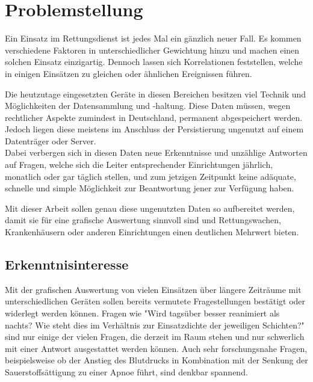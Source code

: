 \documentclass[12pt]{article}
\begin{document}
\maketitle \clearpage

\tableofcontents \clearpage

\section{Problemstellung}\label{problem}
Ein Einsatz im Rettungsdienst ist jedes Mal ein gänzlich neuer Fall. Es kommen
verschiedene Faktoren in unterschiedlicher Gewichtung hinzu und machen einen
solchen Einsatz einzigartig. Dennoch lassen sich Korrelationen feststellen,
welche in einigen Einsätzen zu gleichen oder ähnlichen Ereignissen führen.

Die heutzutage eingesetzten Geräte in diesen Bereichen besitzen viel Technik und
Möglichkeiten der Datensammlung und -haltung. Diese Daten müssen, wegen
rechtlicher Aspekte zumindest in Deutschland, permanent abgespeichert werden.
Jedoch liegen diese meistens im Anschluss der Persistierung ungenutzt auf einem
Datenträger oder Server. \\
Dabei verbergen sich in diesen Daten neue Erkenntnisse und unzählige Antworten
auf Fragen, welche sich die Leiter entsprechender Einrichtungen jährlich,
monatlich oder gar täglich stellen, und zum jetzigen Zeitpunkt keine adäquate,
schnelle und simple Möglichkeit zur Beantwortung jener zur Verfügung haben.

Mit dieser Arbeit sollen genau diese ungenutzten Daten so aufbereitet werden,
damit sie für eine grafische Auswertung sinnvoll sind und Rettungswachen,
Krankenhäusern oder anderen Einrichtungen einen deutlichen Mehrwert bieten.



\subsection{Erkenntnisinteresse}\label{erkenntnis}
Mit der grafischen Auswertung von vielen Einsätzen über längere Zeiträume mit
unterschiedlichen Geräten sollen bereits vermutete Fragestellungen be\-stätigt
oder widerlegt werden können.
Fragen wie "Wird tagsüber besser reanimiert als nachts? Wie steht dies im
Verhältnis zur Einsatzdichte der jeweiligen Schichten?" sind nur einige der
vielen Fragen, die derzeit im Raum stehen und nur schwerlich mit einer Antwort
ausgestattet werden können.
Auch sehr forschungsnahe Fragen, beispielsweise ob der Anstieg des Blutdrucks in
Kombination mit der Senkung der Sauerstoffsättigung zu einer Apnoe führt, sind
denkbar spannend.
\end{document}
